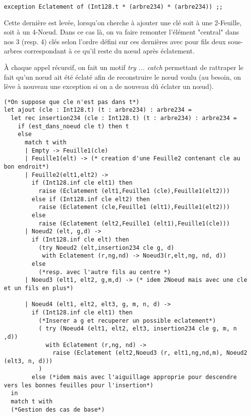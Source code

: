 \documentclass[12pt,a4paper]{article}
\begin{document}
\bigskip \begin{lstlisting}
exception Eclatement of (Int128.t * (arbre234) * (arbre234)) ;;
\end{lstlisting} \bigskip

Cette dernière est levée,  lorsqu'on cherche à ajouter une clé soit à une 2-Feuille, soit à un 4-Nœud. Dans ce cas là, on va faire remonter l'élément "central" dans nos 3 (resp. 4) clés selon l'ordre défini sur ces dernières avec pour fils deux sous-arbres correspondant à ce qu'il reste du nœud après éclatement.

À chaque appel récursif, on fait un motif \textit{try ... catch} permettant de rattraper le fait qu'un nœud ait été éclaté afin de reconstruire le nœud voulu (au besoin, on lève à nouveau une exception si on a de nouveau dû éclater un nœud).

\bigskip \begin{lstlisting}
(*On suppose que cle n'est pas dans t*)
let ajout (cle : Int128.t) (t : arbre234) : arbre234 = 
  let rec insertion234 (cle : Int128.t) (t : arbre234) : arbre234 = 
    if (est_dans_noeud cle t) then t 
    else
      match t with 
      | Empty -> Feuille1(cle)
      | Feuille1(elt) -> (* creation d'une Feuille2 contenant cle au bon endroit*)
      | Feuille2(elt1,elt2) -> 
        if (Int128.inf cle elt1) then 
          raise (Eclatement (elt1,Feuille1 (cle),Feuille1(elt2)))
        else if (Int128.inf cle elt2) then 
          raise (Eclatement (cle,Feuille1 (elt1),Feuille1(elt2))) 
        else 
          raise (Eclatement (elt2,Feuille1 (elt1),Feuille1(cle))) 
      | Noeud2 (elt, g,d) ->  
        if (Int128.inf cle elt) then 
          (try Noeud2 (elt,insertion234 cle g, d)
           with Eclatement (r,ng,nd) -> Noeud3(r,elt,ng, nd, d))
        else 
          (*resp. avec l'autre fils au centre *)
      | Noeud3 (elt1, elt2, g,m,d) -> (* idem 2Noeud mais avec une cle et un fils en plus*)

      | Noeud4 (elt1, elt2, elt3, g, m, n, d) ->
        if (Int128.inf cle elt1) then 
          (*Inserer a g et recuperer un possible eclatement*)
          ( try (Noeud4 (elt1, elt2, elt3, insertion234 cle g, m, n ,d))
            with Eclatement (r,ng, nd) -> 
              raise (Eclatement (elt2,Noeud3 (r, elt1,ng,nd,m), Noeud2 (elt3, n, d)))
          )
        else (*idem mais avec l'aiguillage approprie pour descendre vers les bonnes feuilles pour l'insertion*)
  in 
  match t with 
  (*Gestion des cas de base*)
\end{lstlisting} \bigskip
\end{document}
